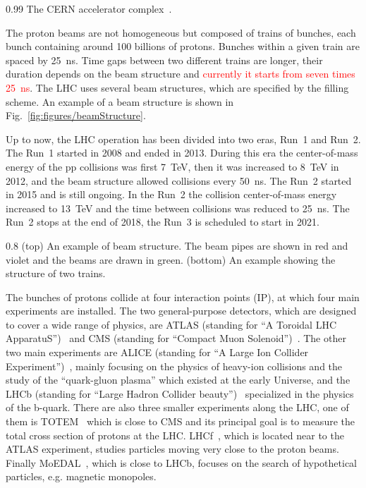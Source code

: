                  {0.99}       %
                 { The CERN accelerator complex~\cite{Mobs:2225847}. }

The proton beams are not homogeneous but composed of trains of bunches, each bunch containing around 100 billions of protons. Bunches within a given train are spaced by 25~ns. Time gaps between two different trains are longer, their duration depends on the beam structure and \textcolor{red}{currently it starts from seven times 25~ns}. The LHC uses several beam structures, which are specified by the filling scheme. An example of a beam structure is shown in Fig.~\ref{fig:figures/beamStructure}. 

Up to now, the LHC operation has been divided into two eras, Run~1 and Run~2. The Run~1 started in 2008 and ended in 2013. During this era the center-of-mass energy of the pp collisions was first 7~TeV, then it was increased to 8~TeV in 2012, and the beam structure allowed collisions every 50~ns. The Run~2 started in 2015 and is still ongoing. In the Run~2 the collision center-of-mass energy increased to 13~TeV and the time between collisions was reduced to 25~ns. The Run~2 stops at the end of 2018, the Run~3 is scheduled to start in 2021.

                 {0.8}       %
                 { (top) An example of beam structure. The beam pipes are shown in red and violet and the beams are drawn in green. (bottom) An example showing the structure of two trains. }

The bunches of protons collide at four interaction points (IP), at which four main experiments are installed. The two general-purpose detectors, which are designed to cover a wide range of physics, are ATLAS (standing for ``A Toroidal  LHC ApparatuS'')~\cite{Aad:2008zzm} and CMS (standing for ``Compact Muon Solenoid'')~\cite{Chatrchyan:2008aa}. The other two main experiments are ALICE (standing for ``A Large Ion Collider Experiment'')~\cite{Aamodt:2008zz}, mainly focusing on the physics of heavy-ion collisions and the study of the ``quark-gluon plasma'' which existed at the early Universe, and the LHCb (standing for ``Large Hadron Collider beauty'')~\cite{Alves:2008zz} specialized in the physics of the b-quark. There are also three smaller experiments along the LHC, one of them is TOTEM~\cite{Anelli:2008zza} which is close to CMS and its principal goal is to measure the total cross section of protons at the LHC. LHCf~\cite{Adriani:2008zz}, which is located near to the ATLAS experiment, studies particles moving very close to the proton beams. Finally MoEDAL~\cite{Acharya:2014nyr}, which is close to LHCb, focuses on the search of hypothetical particles, e.g. magnetic monopoles.

